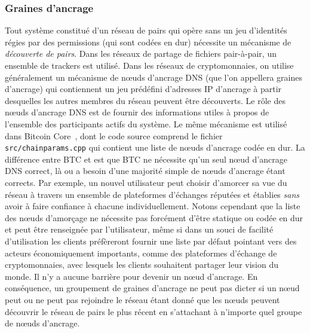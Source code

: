 \documentclass[runningheads,francais,a4paper]{llncs}
\begin{document}
\subsubsection{Graines d'ancrage}
Tout système constitué d'un réseau de pairs qui opère sans un jeu d'identités régies par des permissions (qui sont
codées en dur) nécessite un mécanisme de \emph{découverte de pairs}. Dans les réseaux de partage de fichiers pair-à-pair,
un ensemble de trackers est utilisé. Dans les réseaux de cryptomonnaies, on utilise généralement un mécanisme de nœuds
d'ancrage DNS (que l'on appellera graines d'ancrage) qui contiennent un jeu prédéfini d'adresses IP d'ancrage à partir
desquelles les autres membres du réseau peuvent être découverts. Le rôle des nœuds d'ancrage DNS est de fournir des
informations utiles à propos de l'ensemble des participants actifs du système. Le même mécanisme est utilisé dans
Bitcoin Core~\cite{bitcoin_2018}, dont le code source comprend le fichier \texttt{src/chainparams.cpp} qui contient
une liste de nœuds d'ancrage codée en dur. La différence entre BTC et \AVAPlatformName{} est que BTC ne nécessite
qu'un seul nœud d'ancrage DNS correct, là ou \AVAPlatformName{} a besoin d'une majorité simple de nœuds d'ancrage
étant corrects. Par exemple, un nouvel utilisateur peut choisir d'amorcer sa vue du réseau à travers un ensemble
de plateformes d'échanges réputées et établies \emph{sans} avoir à faire confiance à chacune individuellement. Notons
cependant que la liste des nœuds d'amorçage ne nécessite pas forcément d'être statique ou codée en dur et peut être
renseignée par l'utilisateur, même si dans un souci de facilité d'utilisation les clients préfèreront fournir une liste
par défaut pointant vers des acteurs économiquement importants, comme des plateformes d'échange de cryptomonnaies, avec
lesquels les clients souhaitent partager leur vision du monde. Il n'y a aucune barrière pour devenir un nœud d'ancrage.
En conséquence, un groupement de graines d'ancrage ne peut pas dicter si un nœud peut ou ne peut pas rejoindre le
réseau étant donné que les nœuds peuvent découvrir le réseau de pairs \AVAPlatformName{} le plus récent en s'attachant à
n'importe quel groupe de nœuds d'ancrage.
\end{document}
